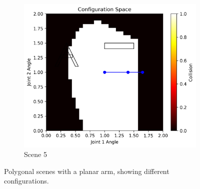 \documentclass{article}
\begin{document}
\begin{figure}[h!]
    \begin{subfigure}{0.45\textwidth}
        \includegraphics[width=\textwidth]{config_space_scene5.png}
        \caption{Scene 5}
    \end{subfigure}
    \caption{Polygonal scenes with a planar arm, showing different configurations.}
    \label{fig:scenes}
\end{figure}
\end{document}
